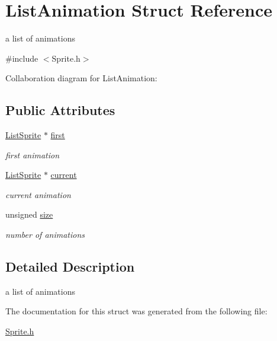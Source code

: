\hypertarget{structListAnimation}{}\section{List\+Animation Struct Reference}
\label{structListAnimation}


a list of animations  




{\ttfamily \#include $<$Sprite.\+h$>$}



Collaboration diagram for List\+Animation\+:
\subsection*{Public Attributes}
\begin{DoxyCompactItemize}
\item 
\hyperlink{structListSprite}{List\+Sprite} $\ast$ \hyperlink{structListAnimation_a10e6ec29763c73d4e86c6f2e826745a0}{first}\hypertarget{structListAnimation_a10e6ec29763c73d4e86c6f2e826745a0}{}\label{structListAnimation_a10e6ec29763c73d4e86c6f2e826745a0}

\begin{DoxyCompactList}\small\item\em first animation \end{DoxyCompactList}\item 
\hyperlink{structListSprite}{List\+Sprite} $\ast$ \hyperlink{structListAnimation_a183b3118dc9a28773848b0ec8c60fc19}{current}\hypertarget{structListAnimation_a183b3118dc9a28773848b0ec8c60fc19}{}\label{structListAnimation_a183b3118dc9a28773848b0ec8c60fc19}

\begin{DoxyCompactList}\small\item\em current animation \end{DoxyCompactList}\item 
unsigned \hyperlink{structListAnimation_a445c07a71a57e1e9ff7312bea9e98f8e}{size}\hypertarget{structListAnimation_a445c07a71a57e1e9ff7312bea9e98f8e}{}\label{structListAnimation_a445c07a71a57e1e9ff7312bea9e98f8e}

\begin{DoxyCompactList}\small\item\em number of animations \end{DoxyCompactList}\end{DoxyCompactItemize}


\subsection{Detailed Description}
a list of animations 

The documentation for this struct was generated from the following file\+:\begin{DoxyCompactItemize}
\item 
\hyperlink{Sprite_8h}{Sprite.\+h}\end{DoxyCompactItemize}
